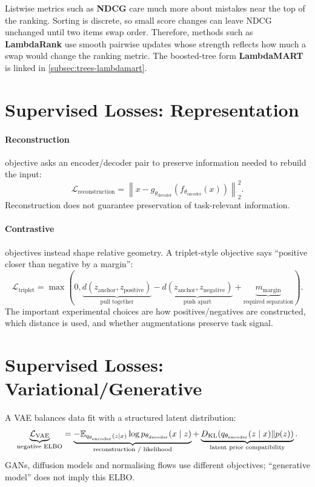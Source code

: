 Listwise metrics such as \textbf{NDCG} care much more about mistakes near the top of the ranking.
Sorting is discrete, so small score changes can leave NDCG unchanged until two items swap order.
Therefore, methods such as \textbf{LambdaRank} use smooth pairwise updates whose strength reflects how much a swap would change the ranking metric.
The boosted-tree form \textbf{LambdaMART} is linked in \cref{subsec:trees-lambdamart}.

\section{Supervised Losses: Representation}
\label{sec:objectives-representation-learning-objectives}
\paragraph{Reconstruction} objective asks an encoder/decoder pair to preserve information needed to rebuild the input:
\[
    \mathcal L_{\text{reconstruction}}
    =
    \left\|x-g_{\theta_{\text{decoder}}}(f_{\theta_{\text{encoder}}}(x))\right\|_2^2.
\]
Reconstruction does not guarantee preservation of task-relevant information.

\paragraph{Contrastive} objectives instead shape relative geometry.
A triplet-style objective says ``positive closer than negative by a margin'':
\[
    \mathcal L_{\text{triplet}}
    =
    \max\left(0,
    \underbrace{d(z_{\text{anchor}},z_{\text{positive}})}_{\text{pull together}}
    -
    \underbrace{d(z_{\text{anchor}},z_{\text{negative}})}_{\text{push apart}}
    +
    \underbrace{m_{\text{margin}}}_{\text{required separation}}
    \right).
\]
The important experimental choices are how positives/negatives are constructed, which distance is used, and whether augmentations preserve task signal.

\section{Supervised Losses: Variational/Generative}
\label{sec:objectives-variational-and-generative-objectives}
A VAE balances data fit with a structured latent distribution:
\[
    \underbrace{\mathcal L_{\mathrm{VAE}}}_{\text{negative ELBO}}
    =
    \underbrace{-\mathbb E_{q_{\theta_{\text{encoder}}}(z\mid x)}\log p_{\theta_{\text{decoder}}}(x\mid z)}_{\text{reconstruction / likelihood}}
    +
    \underbrace{D_{\mathrm{KL}}\!\left(q_{\theta_{\text{encoder}}}(z\mid x)\|p(z)\right)}_{\text{latent prior compatibility}}.
\]
GANs, diffusion models and normalising flows use different objectives; ``generative model'' does not imply this ELBO.

